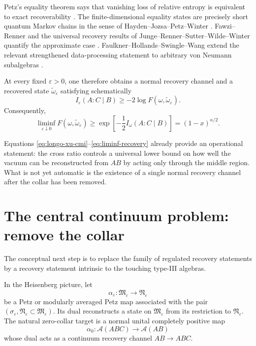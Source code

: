 \documentclass[11pt]{article}
\theoremstyle{accenttheorem}
\theoremstyle{definition}
\newcommand{\cA}{\mathcal{A}}
\newcommand{\cM}{\mathfrak{M}}
\newcommand{\cN}{\mathfrak{N}}
\newcommand{\CMI}{I}
\newcommand{\eps}{\varepsilon}
\newcommand{\1}{\mathbf{1}}
\begin{document}
Petz's equality theorem says that vanishing loss of relative entropy is equivalent to exact recoverability \cite{Petz1986,Petz1988}.  The finite-dimensional equality states are precisely short quantum Markov chains in the sense of Hayden--Jozsa--Petz--Winter \cite{HJPW}.  Fawzi--Renner and the universal recovery results of Junge--Renner--Sutter--Wilde--Winter quantify the approximate case \cite{FawziRenner,JungeEtAl}.  Faulkner--Hollands--Swingle--Wang extend the relevant strengthened data-processing statement to arbitrary von Neumann subalgebras \cite{FaulknerEtAl}.

At every fixed \(\eps>0\), one therefore obtains a normal recovery channel and a recovered state \(\widetilde\omega_\eps\) satisfying schematically
\begin{equation}\label{eq:fh-bound}
 \CMI_\eps(A:C\mid B)
 \ge -2\log F(\omega,\widetilde\omega_\eps).
\end{equation}
Consequently,
\begin{equation}\label{eq:liminf-recovery}
 \liminf_{\eps\downarrow0}F(\omega,\widetilde\omega_\eps)
 \ge \exp\!\left[-\frac12\CMI_\omega(A:C\mid B)\right]
 =(1-x)^{\kappa/2}.
\end{equation}

\begin{establishedbox}
Equations \eqref{eq:longo-xu-cmi}--\eqref{eq:liminf-recovery} already provide an operational statement: the cross ratio controls a universal lower bound on how well the vacuum can be reconstructed from \(AB\) by acting only through the middle region.  What is not yet automatic is the existence of a single normal recovery channel after the collar has been removed.
\end{establishedbox}

\section{The central continuum problem: remove the collar}

The conceptual next step is to replace the family of regulated recovery statements by a recovery statement intrinsic to the touching type-III algebras.

In the Heisenberg picture, let
\[
 \alpha_\eps:\cM_\eps\longrightarrow\cN_\eps
\]
be a Petz or modularly averaged Petz map associated with the pair \((\sigma_\eps,\cN_\eps\subset\cM_\eps)\).  Its dual reconstructs a state on \(\cM_\eps\) from its restriction to \(\cN_\eps\).  The natural zero-collar target is a normal unital completely positive map
\begin{equation}\label{eq:alpha0}
 \alpha_0:\cA(ABC)\longrightarrow\cA(AB)
\end{equation}
whose dual acts as a continuum recovery channel \(AB\to ABC\).
\end{document}
